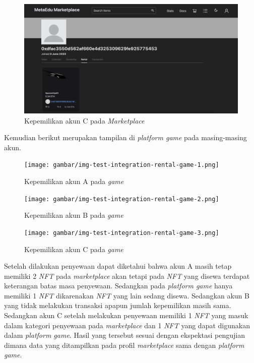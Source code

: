   \begin{figure} [H] \centering
            \includegraphics[scale=0.2]{gambar/img-test-integration-rental-profile-3.png}
            \caption{Kepemilikan akun C pada \emph{Marketplace}}
            \label{fig:TestIntegrationPurchaseProfile3}
        \end{figure}

Kemudian berikut merupakan tampilan di \emph{platform game} pada masing-masing akun.

\begin{figure} [H] \centering
            \texttt{[image: gambar/img-test-integration-rental-game-1.png]}
            \caption{Kepemilikan akun A pada \emph{game}}
            \label{fig:TestIntegrationPurchaseGame1}
        \end{figure}

\begin{figure} [H] \centering
            \texttt{[image: gambar/img-test-integration-rental-game-2.png]}
            \caption{Kepemilikan akun B pada \emph{game}}
            \label{fig:TestIntegrationPurchaseGame2}
        \end{figure}
        
\begin{figure} [H] \centering
            \texttt{[image: gambar/img-test-integration-rental-game-3.png]}
            \caption{Kepemilikan akun C pada \emph{game}}
            \label{fig:TestIntegrationPurchaseGame3}
        \end{figure}

Setelah dilakukan penyewaan dapat diketahui bahwa akun A masih tetap memiliki 2 \emph{NFT} pada \emph{marketplace} akan tetapi pada \emph{NFT} yang disewa terdapat keterangan batas masa penyewaan. Sedangkan pada \emph{platform game} hanya memiliki 1 \emph{NFT} dikarenakan \emph{NFT} yang lain sedang disewa. Sedangkan akun B yang tidak melakukan transaksi apapun jumlah kepemilikan masih sama. Sedangkan akun C setelah melakukan penyewaan memiliki 1 \emph{NFT} yang masuk dalam kategori penyewaan pada \emph{marketplace} dan 1 \emph{NFT} yang dapat digunakan dalam \emph{platform game}. Hasil yang tersebut sesuai dengan ekspektasi pengujian dimana data yang ditampilkan pada profil \emph{marketplace} sama dengan \emph{platform game}. 

